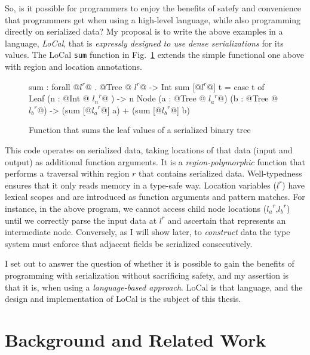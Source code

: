\documentclass[showabstract,showacknowledgments,showpreface,showdedication,school]{iuphd}
\makeatletter
\theoremstyle{nonumberplain}
\newcommand{\sysname}[0]{LoCal\xspace}
\newcommand{\ourcalc}[0]{\sysname}
\newcommand{\locreg}[2]{\ensuremath{{#1}^{#2}}}
\newcommand{\tyatlocreg}[3]{#1 \ensuremath{@} \locreg{#2}{#3}}
\newcommand{\Figref}[1]{Fig.~\ref{#1}}
\newcommand{\il}[1]{\lstinline[style=inline,mathescape=true];#1;}
\makeatother
\begin{document}
So, is it possible for programmers to enjoy the benefits of satefy and
convenience that programmers get when using a high-level language, while also
programming directly on serialized data?
My proposal is to write the above examples in a language,
\emph{\ourcalc}, that is \emph{expressly designed to use dense serializations}
for its values. The \ourcalc{} \il{sum} function in \Figref{fig:gibbon_sumtree}
extends the simple functional one above with region and location annotations.

\begin{figure}
\begin{code}
sum : forall @\locreg{l}{r}@ . @\tyatlocreg{Tree}{l}{r}@ -> Int
sum [@\locreg{l}{r}@] t = case t of
              Leaf (n : @\tyatlocreg{Int}{l_n}{r}@ ) -> n
              Node (a : @\tyatlocreg{Tree}{l_a}{r}@) (b : @\tyatlocreg{Tree}{l_b}{r}@)
               -> (sum [@\locreg{l_a}{r}@] a) + (sum [@\locreg{l_b}{r}@] b)
\end{code}
\caption{Function that sums the leaf values of a serialized binary tree}
\label{fig:gibbon_sumtree}
\end{figure}


This code operates on serialized data, taking locations of that data (input and
output) as additional function arguments.  It is a {\em region-polymorphic}
function that performs a traversal within region $r$ that contains serialized
data.  Well-typedness ensures that it only reads memory in a type-safe way.
Location variables ($\locreg{l}{r}$) have lexical scopes and are introduced as
function arguments and pattern matches.
For instance, in the above program, we cannot
access child node locations ($\locreg{l_a}{r}$,$\locreg{l_b}{r}$) until we correctly parse the input
data at $l^r$ and ascertain that represents an intermediate node.
Conversely, as I will show later, to \emph{construct} data the type system must
enforce that adjacent fields be serialized consecutively.

I set out to answer the question of whether it is possible to gain the benefits
of programming with serialization without sacrificing safety, and my assertion
is that it is, when using a \emph{language-based approach}. \ourcalc{} is that
language, and the design and implementation of \ourcalc{} is the subject of this
thesis.

\section{Background and Related Work}\label{sec:bg}
\end{document}
